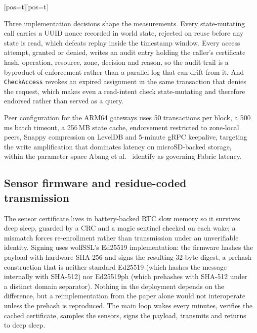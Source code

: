 \documentclass[a4paper,fleqn]{cas-sc}
\makeatletter
\newenvironment{widefig}[1][pos=t]
  {\ifdoublecol \@nameuse{figure*}[#1]\else \@nameuse{figure}[#1]\fi}
  {\ifdoublecol \@nameuse{endfigure*}\else \@nameuse{endfigure}\fi}
\makeatother
\begin{document}
\begin{widefig}
\caption{Access control within the Fabric execute-order-validate transaction flow.}
\label{fig:flow}
\end{widefig}

Three implementation decisions shape the measurements. Every state-mutating
call carries a UUID nonce recorded in world state, rejected on reuse before
any state is read, which defeats replay inside the timestamp window. Every
access attempt, granted or denied, writes an audit entry holding the caller's
certificate hash, operation, resource, zone, decision and reason, so the
audit trail is a byproduct of enforcement rather than a parallel log that can
drift from it. And \texttt{CheckAccess} revokes an expired assignment in the
same transaction that denies the request, which makes even a read-intent
check state-mutating and therefore endorsed rather than served as a query.

Peer configuration for the ARM64 gateways uses 50 transactions per block, a
500\,ms batch timeout, a 256\,MB state cache, endorsement restricted to
zone-local peers, Snappy compression on LevelDB and 5-minute gRPC keepalive,
targeting the write amplification that dominates latency on microSD-backed
storage, within the parameter space Abang et al.\ \cite{abang2024latency}
identify as governing Fabric latency.

\subsection{Sensor firmware and residue-coded transmission}
\label{subsec:firmware}

The sensor certificate lives in battery-backed RTC slow memory so it
survives deep sleep, guarded by a CRC and a magic sentinel checked on each
wake; a mismatch forces re-enrollment rather than transmission under an
unverifiable identity. Signing uses wolfSSL's Ed25519 implementation: the
firmware hashes the payload with hardware SHA-256 and signs the resulting
32-byte digest, a prehash construction that is neither standard Ed25519
(which hashes the message internally with SHA-512) nor Ed25519ph (which
prehashes with SHA-512 under a distinct domain separator). Nothing in the
deployment depends on the difference, but a reimplementation from the
paper alone would not interoperate unless the prehash is reproduced. The
main loop wakes every \DutyCycleMinutes{} minutes, verifies the cached
certificate, samples the sensors, signs the payload, transmits and returns
to deep sleep.
\end{document}
